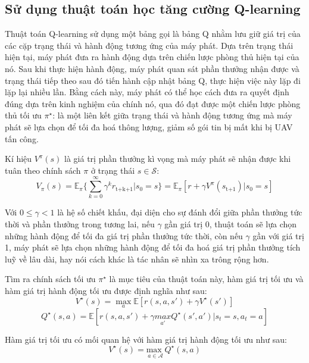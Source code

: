 \documentclass{uetgraduation}
\begin{document}
\subsection{Sử dụng thuật toán học tăng cường Q-learning}
Thuật toán Q-learning sử dụng một bảng gọi là bảng Q nhằm lưu giữ giá trị của các cặp trạng thái và hành động tương ứng của máy phát. Dựa trên trạng thái hiện tại, máy phát đưa ra hành động dựa trên
chiến lược phòng thủ hiện tại của nó. Sau khi thực hiện hành động, máy phát quan sát phần thưởng nhận được và trạng thái tiếp theo sau đó tiến hành cập nhật bảng Q, thực hiện việc này lặp đi lặp lại nhiều lần. 
Bằng cách này, máy phát có thể học cách đưa ra quyết định đúng dựa trên kinh nghiệm của chính nó, qua đó đạt được một chiến lược phòng thủ tối ưu $\pi^\star$: là một liên kết giữa trạng thái và hành động tương
ứng mà máy phát sẽ lựa chọn để tối đa hoá thông lượng, giảm số gói tin bị mất khi bị UAV tấn công.

Kí hiệu $V^\pi (s)$ là giá trị phần thưởng kì vọng mà máy phát sẽ nhận được khi tuân theo chính sách $\pi$ ở trạng thái $s \in \mathcal{S}$:
\begin{equation}
    V_\pi (s) = \mathbb{E}_\pi \{\sum_{k=0}^{\infty} \gamma^k r_\text{t+k+1} | s_0 = s\} = \mathbb{E}_\pi [r + \gamma V^\pi (s_\text{t+1}) | s_0 = s]
\end{equation}

Với $0 \leq \gamma < 1$ là hệ số chiết khấu, đại diện cho sự đánh đổi giữa phần thưởng tức thời và phần thưởng trong tương lai, nếu $\gamma$ gần giá trị 0, thuật toán sẽ lựa chọn những hành động để
tối đa giá trị phần thưởng tức thời, còn nếu $\gamma$ gần với giá trị 1, máy phát sẽ lựa chọn những hành động để tối đa hoá giá trị phần thưởng tích luỹ về lâu dài, hay nói cách khác là tác nhân sẽ nhìn xa
trông rộng hơn.

Tìm ra chính sách tối ưu $\pi^\star$ là mục tiêu của thuật toán này, hàm giá trị tối ưu và hàm giá trị hành động tối ưu được định nghĩa như sau:
\begin{equation}
    V^\star (s) = \underset{a}{\max} \mathbb{E} [r(s, a, s') + \gamma V^\star (s')]
\end{equation}
\begin{equation}
    Q^\star (s, a) = \mathbb{E} [r(s, a, s') + \gamma \underset{a'}{ max } Q^\star (s', a') | s_t = s, a_t = a]
\end{equation}

Hàm giá trị tối ưu có mối quan hệ với hàm giá trị hành động tối ưu như sau:
\begin{equation}
    V^\star (s) = \underset{a \in \mathcal{A}}{\text{max }} Q^\star (s, a)
\end{equation}
\end{document}
